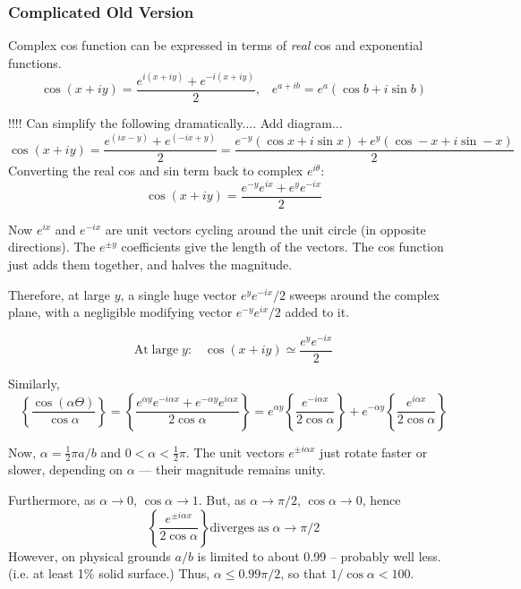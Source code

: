 \documentclass[a4paper]{report}
\begin{document}
\subsubsection*{Complicated Old Version}

Complex cos function can be expressed in terms of \emph{real} cos and exponential functions.
\begin{equation}
\cos (x + iy) = \frac{e^{i(x+iy)}+e^{-i(x+iy)}}{2}, \;\;\;
 e^{a+ib} = e^{a}(\cos b + i\sin b )
\end{equation}

 !!!! Can simplify the following dramatically....  Add diagram...
\[ \cos (x + iy) = 
   \frac{e^{(ix-y)}+e^{(-ix+y)}}{2} =
   \frac{e^{-y}(\cos x + i\sin x) + e^{y}(\cos -x + i\sin -x)}{2}   \] 
   Converting the real cos and sin term back to complex $e^{i\theta}:$
\[\cos (x + iy) = \frac{e^{-y} e^{ix} + e^{y} e^{-ix}}{2} \]

Now $e^{ix}$ and $e^{-ix}$ are unit vectors cycling around the unit circle (in opposite directions). The $e^{\pm y}$ coefficients give the length of the vectors.  The cos function just adds them together, and halves the magnitude. 

Therefore, at large $y$, a single huge vector $e^{y} e^{-ix}/2$ sweeps around the complex plane, with a negligible modifying vector $e^{-y} e^{ix}/2$ added to it.

\[ \mathrm{At \; large \; }y: \;\;\; \cos (x + iy) \simeq \frac{e^{y} e^{-ix}}{2}  \]

Similarly,\[\left\{ \frac{\cos(\alpha \Theta)}{\cos \alpha} \right\} =
\left\{ \frac{e^{\alpha y} e^{- i \alpha x} + e^{-\alpha y} e^{ i \alpha x}}
{2 \cos \alpha} \right\} =
e^{\alpha y}  \left\{ \frac{ e^{- i \alpha x}}{2 \cos \alpha} \right\} + 
e^{-\alpha y}  \left\{ \frac{ e^{ i \alpha x}}{2 \cos \alpha} \right\}\]

Now, $\alpha = \frac{1}{2} \pi a/b$ and $0 < \alpha < \frac{1}{2} \pi$.
The unit vectors $e^{\pm i \alpha x}$ just rotate faster or slower, depending on $\alpha$ --- their magnitude remains unity.

Furthermore, as $\alpha \rightarrow 0$, $\cos \alpha \rightarrow 1$. But, as $\alpha \rightarrow \pi/2$, $\cos \alpha \rightarrow 0$, hence
\[ \left\{ \frac{ e^{ \pm i \alpha x}}{2 \cos \alpha} \right\} \mathrm{diverges \; as \;}
\alpha \rightarrow \pi/2 \]
However, on physical grounds $a/b$ is limited to about 0.99 -- probably well less.  (i.e. at least 1\% solid surface.)  Thus, $\alpha \leq 0.99 \pi/2$, so that $1/ \cos \alpha < 100$.
\end{document}
